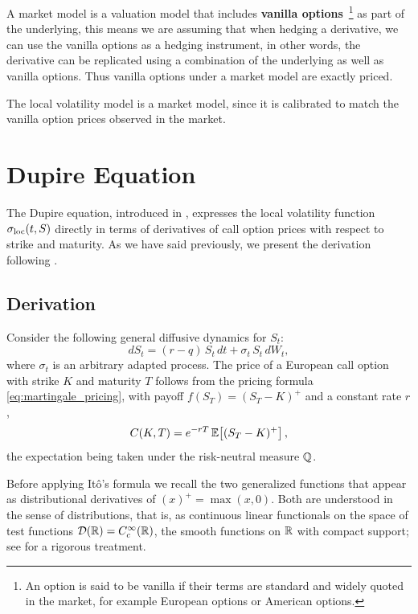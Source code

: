 A market model is a valuation model that includes \textbf{vanilla options}~\footnote{
    An option is said to be vanilla if their terms are standard and widely quoted in the market,
    for example European options or American options.
} as part of the underlying,
this means we are assuming that when hedging a derivative,
we can use the vanilla options as a hedging instrument,
in other words,
the derivative can be replicated using a combination of the underlying as well as vanilla options.
Thus vanilla options under a market model are exactly priced.

The local volatility model is a market model,
since it is calibrated to match the vanilla option prices observed in the market.

\section{Dupire Equation}

The Dupire equation, introduced in \cite{dupire_pricing_smile},
expresses the local volatility function $\sigma_{\mathrm{loc}}(t, S)$ directly in terms of derivatives
of call option prices with respect to strike and maturity.
As we have said previously,
we present the derivation following \cite{bergomi_stochastic_vol}.

\subsection{Derivation}

Consider the following general diffusive dynamics for $S_t$:
\begin{equation}\label{eq:log-normal_diffusion}
    dS_t = (r - q)\,S_t\,dt + \sigma_t\,S_t\,dW_t,
\end{equation}
where $\sigma_t$ is an arbitrary adapted process.
The price of a European call option with strike $K$ and maturity $T$ follows from the pricing
formula \eqref{eq:martingale_pricing}, with payoff $f(S_T) = (S_T - K)^+$ and a constant rate $r$,
\begin{equation*}
    C(K, T) = e^{-rT}\,\mathbb{E}\!\left[(S_T - K)^+\right],
\end{equation*}
the expectation being taken under the risk-neutral measure $\mathbb{Q}$.

Before applying It\^{o}'s formula we recall the two generalized functions
that appear as distributional derivatives of $(x)^+ = \max(x, 0)$.
Both are understood in the sense of distributions,
that is, as continuous linear functionals on the space of test functions
$\mathcal{D}(\mathbb{R}) = C_c^{\infty}(\mathbb{R})$,
the smooth functions on $\mathbb{R}$ with compact support;
see \cite[Ch. 1 and 3]{friedlander_joshi} for a rigorous treatment.

